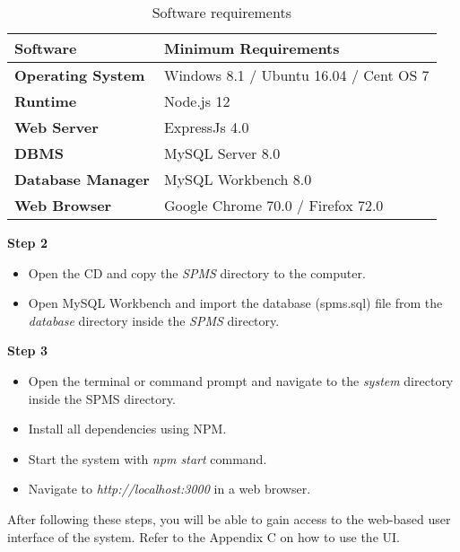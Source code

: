 \documentclass[12pt]{report}
\begin{document}
\begin{table}[H]
	\centering
	\begin{tabular}{ | p{2.5cm} | p{8.5cm} |}
		\hline
		\bf{Software}         & \bf{Minimum Requirements}              \\
		\hline
		\bf{Operating System} & Windows 8.1 / Ubuntu 16.04 / Cent OS 7 \\
		\hline
		\bf{Runtime}          & Node.js 12                             \\
		\hline
		\bf{Web Server}       & ExpressJs  4.0                         \\
		\hline
		\bf{DBMS}             & MySQL Server 8.0                       \\
		\hline
		\bf{Database Manager} & MySQL Workbench 8.0                    \\
		\hline
		\bf{Web Browser}      & Google Chrome 70.0 / Firefox   72.0    \\
		\hline
	\end{tabular}
	\caption{Software requirements}
	\label{tbl:softwareRequirements}
\end{table}

\noindent
{\large{\bf{Step 2}}}
\begin{itemize}
	\item Open the CD and copy the {\it{SPMS}} directory to the computer.
	\item Open MySQL Workbench and import the database (spms.sql) file from the {\it{database}} directory inside the {\it{SPMS}} directory.
\end{itemize}

\noindent
{\large{\bf{Step 3}}}
\begin{itemize}
	\item Open the terminal or command prompt and navigate to the {\it{system}} directory inside the SPMS directory.
	\item Install all dependencies using NPM.
	\item Start the system with {\it{npm start}} command.
	\item Navigate to {\it{http://localhost:3000}} in a web browser.
\end{itemize}

After following these steps, you will be able to gain access to the web-based user interface of the system. Refer to the Appendix C on how to use the UI.

\setcounter{chapter}{2}
\setcounter{section}{0}
\setcounter{figure}{0}
\end{document}
